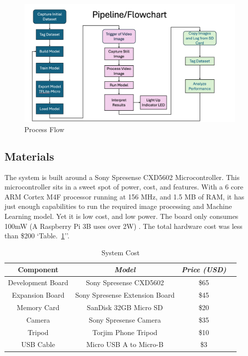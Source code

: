 \documentclass[conference]{IEEEtran}
\begin{document}
\begin{figure}[htbp]
\centerline{\includegraphics[scale=.22]{flowChart.png}}
\caption{Process Flow}
\label{flowChart}
\end{figure}

\subsection{Materials}

The system is built around a Sony Spresense CXD5602\cite{sony} Microcontroller. This microcontroller sits in a sweet spot of power, cost, and features. With a 6 core ARM Cortex M4F processor running at 156 MHz, and 1.5 MB of RAM, it has just enough capabilities to run the required image processing and Machine Learning model. Yet it is low cost, and low power. The board only consumes 100mW (A Raspberry Pi 3B uses over 2W) \cite{sony}. The total hardware cost was less than \$200 `Table.~\ref{sysCost}''.

\begin{table}[htbp]
\caption{System Cost}
\begin{center}
\begin{tabular}{|c|c|c|c|}
\hline
\textbf{Component} & \textbf{\textit{Model}}& \textbf{\textit{Price (USD)}}   \\ \hline 
Development Board& Sony Spresense CXD5602 &   \$65\\ \hline 
Expansion Board& Sony Spresense Extension Board & \$45  \\ \hline
Memory Card& SanDisk 32GB Micro SD & \$20  \\ \hline
Camera& Sony Spresense Camera & \$35  \\ \hline
Tripod& Torjim Phone Tripod & \$10  \\ \hline
USB Cable& Micro USB A to Micro-B & \$3  \\ \hline
\end{tabular}
\label{sysCost}
\end{center}
\end{table}
\end{document}
